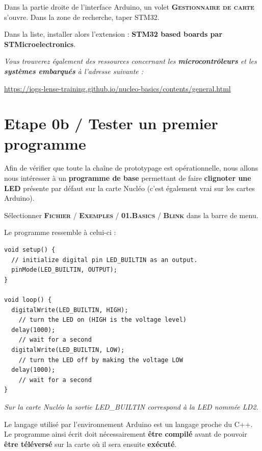 \documentclass[a4paper,11pt,titlepage]{article} %
\begin{document}
Dans la partie droite de l'interface Arduino, un volet \textsc{\textbf{Gestionnaire de carte}} s'ouvre. Dans la zone de recherche, taper STM32.

Dans la liste, installer alors l'extension : \textbf{STM32 based boards par STMicroelectronics}.



\bigskip 

\textit{Vous trouverez également des ressources concernant les \textbf{microcontrôleurs} et les \textbf{systèmes embarqués} à l'adresse suivante :}

\href{https://iogs-lense-training.github.io/nucleo-basics/contents/general.html}{https://iogs-lense-training.github.io/nucleo-basics/contents/general.html}


\cleardoublepage
\section{Etape 0b / Tester un premier programme}

Afin de vérifier que toute la chaîne de prototypage est opérationnelle, nous allons nous intéresser à un \textbf{programme de base} permettant de faire \textbf{clignoter une LED} présente par défaut sur la carte Nucléo (c'est également vrai sur les cartes Arduino).

Sélectionner \textsc{\textbf{Fichier} / \textbf{Exemples} / \textbf{01.Basics} / \textbf{Blink}} dans la barre de menu.

Le programme ressemble à celui-ci :

\begin{lstlisting}
void setup() {
  // initialize digital pin LED_BUILTIN as an output.
  pinMode(LED_BUILTIN, OUTPUT);
}

void loop() {
  digitalWrite(LED_BUILTIN, HIGH);  
  	// turn the LED on (HIGH is the voltage level)
  delay(1000);                      
  	// wait for a second
  digitalWrite(LED_BUILTIN, LOW);   
  	// turn the LED off by making the voltage LOW
  delay(1000);                      
  	// wait for a second
}
\end{lstlisting}

\textit{Sur la carte Nucléo la sortie LED\_BUILTIN correspond à la LED nommée LD2.}

Le langage utilisé par l'environnement Arduino est un langage proche du C++. Le programme ainsi écrit doit nécessairement \textbf{être compilé} avant de pouvoir \textbf{être téléversé} sur la carte où il sera ensuite \textbf{exécuté}.
\end{document}
